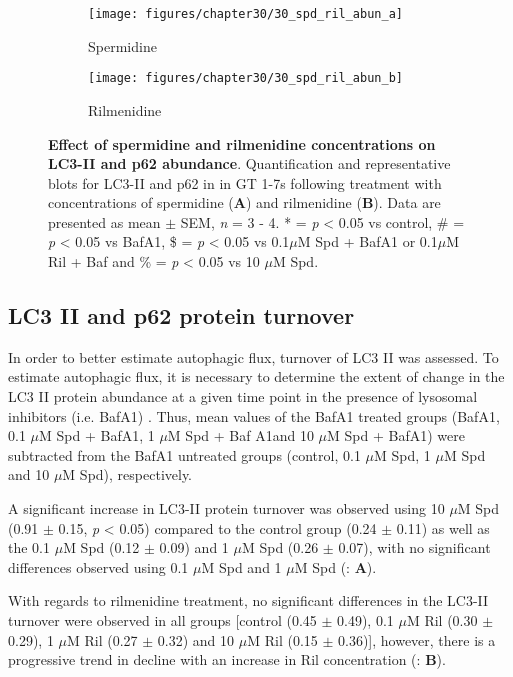 {\begin{landscape}
\begin{figure}[!htbp]
  \centering
  \begin{subfigure}[b]{0.35\linewidth}
    \texttt{[image: figures/chapter30/30\_spd\_ril\_abun\_a]}
    \caption{Spermidine}
  \end{subfigure}
  \begin{subfigure}[b]{0.35\linewidth}
    \texttt{[image: figures/chapter30/30\_spd\_ril\_abun\_b]}
    \caption{Rilmenidine}
  \end{subfigure}
  \caption[Effect of spermidine and rilmenidine concentrations on LC3-II and p62 abundance]{\textbf{Effect of spermidine and rilmenidine concentrations on LC3-II and p62 abundance}. Quantification and representative blots for LC3-II and p62 in in GT 1-7s following treatment with concentrations of spermidine (\textbf{A}) and rilmenidine (\textbf{B}). Data are presented as mean $\pm$ SEM, \textit{n} = 3 - 4. * = \textit{p} < 0.05 vs control, \# = \textit{p} < 0.05 vs BafA1, \$ = \textit{p} < 0.05 vs 0.1$\mu$M Spd + BafA1 or 0.1$\mu$M Ril + Baf and \% = \textit{p} < 0.05 vs 10 $\mu$M Spd.}
  \label{fig:30_spd_ril_abun_a}
\end{figure}
\end{landscape}

\subsection{LC3 II and p62 protein turnover}
In order to better estimate autophagic flux, turnover of LC3 II was assessed. To estimate autophagic flux, it is necessary to determine the extent of change in the LC3 II protein abundance at a given time point in the presence of lysosomal inhibitors (i.e. BafA1) \citep{Martinez-Lopez2013}. Thus, mean values of the BafA1 treated groups (BafA1, 0.1 $\mu$M Spd + BafA1, 1 $\mu$M Spd + Baf A1and 10 $\mu$M Spd + BafA1) were subtracted from the BafA1 untreated groups (control, 0.1 $\mu$M Spd, 1 $\mu$M Spd and 10 $\mu$M Spd), respectively.

A significant increase in LC3-II protein turnover was observed using 10 $\mu$M Spd (0.91 $\pm$ 0.15, \textit{p} < 0.05) compared to the control group (0.24 $\pm$ 0.11) as well as the 0.1 $\mu$M Spd (0.12 $\pm$ 0.09) and 1 $\mu$M Spd (0.26 $\pm$ 0.07), with no significant differences observed using 0.1 $\mu$M Spd  and 1 $\mu$M Spd (: \textbf{A}). 

With regards to rilmenidine treatment, no significant differences in the LC3-II turnover were observed in all groups [control (0.45 $\pm$ 0.49), 0.1 $\mu$M Ril (0.30 $\pm$ 0.29), 1 $\mu$M Ril (0.27 $\pm$ 0.32) and 10 $\mu$M Ril (0.15 $\pm$ 0.36)], however, there is a progressive trend in decline with an increase in Ril concentration (: \textbf{B}). 

}
